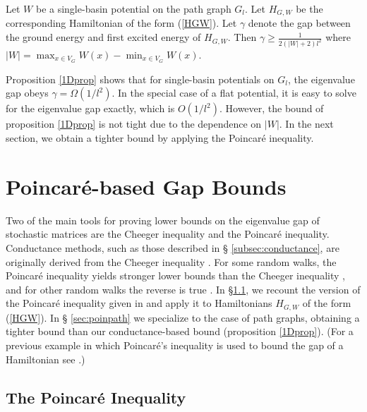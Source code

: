 \begin{lem}
\label{1Dprop}
Let $W$ be a single-basin potential on the path graph $G_l$. Let
$H_{G,W}$ be the corresponding Hamiltonian of the form
(\ref{HGW}). Let $\gamma$ denote the gap between the ground energy and
first excited energy of $H_{G,W}$. Then $\gamma \geq
\frac{1}{2(|W|+2)l^2}$ where $|W| = \max_{x \in V_G} W(x) - \min_{x
  \in V_G} W(x)$.
\end{lem}

Proposition \ref{1Dprop} shows that for single-basin potentials on
$G_l$, the eigenvalue gap obeys $\gamma = \Omega(1/l^2)$. In the
special case of a flat potential, it is easy to solve for the
eigenvalue gap exactly, which is $O(1/l^2)$. However, the bound of
proposition \ref{1Dprop} is not tight due to the dependence on
$|W|$. In the next section, we obtain a tighter bound by applying
the Poincar\'e inequality.

\section{Poincar\'e-based Gap Bounds}

Two of the main tools for proving lower bounds on the eigenvalue gap
of stochastic matrices are the Cheeger inequality and the Poincar\'e
inequality. Conductance methods, such as those described in \S
\ref{subsec:conductance}, are originally derived from the Cheeger
inequality \cite{Cheeger}. For some random walks, the Poincar\'e
inequality yields stronger lower bounds than the Cheeger inequality
\cite{DS91, FW99}, and for other random walks the reverse is true
\cite{P12}. In \S \ref{sec:poincare}, we recount the version of
the Poincar\'e inequality given in \cite{DS91} and apply it to
Hamiltonians $H_{G,W}$ of the form (\ref{HGW}). In \S
\ref{sec:poinpath} we specialize to the case of path graphs, obtaining
a tighter bound than our conductance-based bound (proposition
\ref{1Dprop}). (For a previous example in which Poincar\'e's
inequality is used to bound the gap of a Hamiltonian see
\cite{BCMNS12}.)

\subsection{The Poincar\'e Inequality}
\label{sec:poincare}

